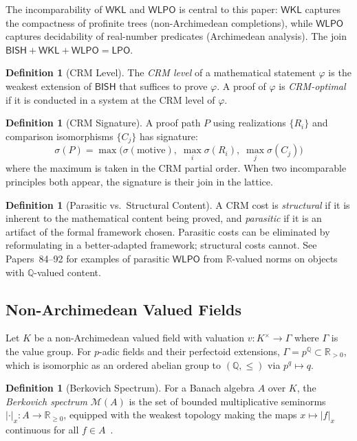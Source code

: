 \documentclass[11pt,a4paper]{article}
\theoremstyle{plain}
\theoremstyle{definition}
\newtheorem{definition}[theorem]{Definition}
\newcommand{\BISH}{\textsf{BISH}}
\newcommand{\WKL}{\textsf{WKL}}
\newcommand{\WLPO}{\textsf{WLPO}}
\newcommand{\LPO}{\textsf{LPO}}
\newcommand{\Q}{\mathbb{Q}}
\newcommand{\R}{\mathbb{R}}
\newcommand{\sig}{\sigma}
\begin{document}
The incomparability of $\WKL$ and $\WLPO$ is central to this paper: $\WKL$ captures the compactness of profinite trees (non-Archimedean completions), while $\WLPO$ captures decidability of real-number predicates (Archimedean analysis). The join $\BISH + \WKL + \WLPO = \LPO$.

\begin{definition}[CRM Level]\label{def:crm-level}
The \emph{CRM level} of a mathematical statement $\varphi$ is the weakest extension of $\BISH$ that suffices to prove $\varphi$. A proof of $\varphi$ is \emph{CRM-optimal} if it is conducted in a system at the CRM level of $\varphi$.
\end{definition}

\begin{definition}[CRM Signature]\label{def:crm-sig}
A proof path $P$ using realizations $\{R_i\}$ and comparison isomorphisms $\{C_j\}$ has signature:
\[
\sig(P) = \max\bigl(\sig(\text{motive}),\; \max_i \sig(R_i),\; \max_j \sig(C_j)\bigr)
\]
where the maximum is taken in the CRM partial order. When two incomparable principles both appear, the signature is their join in the lattice.
\end{definition}

\begin{definition}[Parasitic vs.\ Structural Content]\label{def:parasitic}
A CRM cost is \emph{structural} if it is inherent to the mathematical content being proved, and \emph{parasitic} if it is an artifact of the formal framework chosen. Parasitic costs can be eliminated by reformulating in a better-adapted framework; structural costs cannot. See Papers~84--92 for examples of parasitic $\WLPO$ from $\R$-valued norms on objects with $\Q$-valued content.
\end{definition}

\subsection{Non-Archimedean Valued Fields}

Let $K$ be a non-Archimedean valued field with valuation $v: K^\times \to \Gamma$ where $\Gamma$ is the value group. For $p$-adic fields and their perfectoid extensions, $\Gamma = p^{\Q} \subset \R_{>0}$, which is isomorphic as an ordered abelian group to $(\Q, \leq)$ via $p^q \mapsto q$.

\begin{definition}[Berkovich Spectrum]\label{def:berkovich}
For a Banach algebra $A$ over $K$, the \emph{Berkovich spectrum} $\mathcal{M}(A)$ is the set of bounded multiplicative seminorms $|\cdot|_x : A \to \R_{\geq 0}$, equipped with the weakest topology making the maps $x \mapsto |f|_x$ continuous for all $f \in A$~\cite{berkovich90}.
\end{definition}
\end{document}
